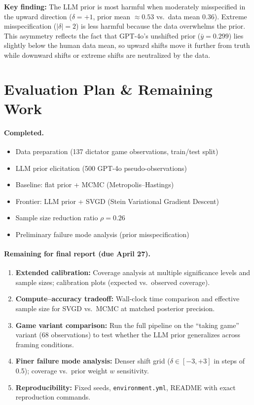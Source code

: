 \documentclass[11pt]{article}
\begin{document}
\textbf{Key finding:} The LLM prior is most harmful when moderately misspecified in the upward direction ($\delta = +1$, prior mean $\approx 0.53$ vs.\ data mean $0.36$).
Extreme misspecification ($|\delta| = 2$) is less harmful because the data overwhelms the prior.
This asymmetry reflects the fact that GPT-4o's unshifted prior ($\bar{y} = 0.299$) lies slightly below the human data mean, so upward shifts move it further from truth while downward shifts or extreme shifts are neutralized by the data.

\section{Evaluation Plan \& Remaining Work}

\paragraph{Completed.}
\begin{itemize}
  \item Data preparation (137 dictator game observations, train/test split)
  \item LLM prior elicitation (500 GPT-4o pseudo-observations)
  \item Baseline: flat prior + MCMC (Metropolis--Hastings)
  \item Frontier: LLM prior + SVGD (Stein Variational Gradient Descent)
  \item Sample size reduction ratio $\rho = 0.26$
  \item Preliminary failure mode analysis (prior misspecification)
\end{itemize}

\paragraph{Remaining for final report (due April 27).}
\begin{enumerate}
  \item \textbf{Extended calibration:} Coverage analysis at multiple significance levels and sample sizes; calibration plots (expected vs.\ observed coverage).
  \item \textbf{Compute--accuracy tradeoff:} Wall-clock time comparison and effective sample size for SVGD vs.\ MCMC at matched posterior precision.
  \item \textbf{Game variant comparison:} Run the full pipeline on the ``taking game'' variant (68 observations) to test whether the LLM prior generalizes across framing conditions.
  \item \textbf{Finer failure mode analysis:} Denser shift grid ($\delta \in [-3, +3]$ in steps of 0.5); coverage vs.\ prior weight $w$ sensitivity.
  \item \textbf{Reproducibility:} Fixed seeds, \texttt{environment.yml}, README with exact reproduction commands.
\end{enumerate}
\end{document}

